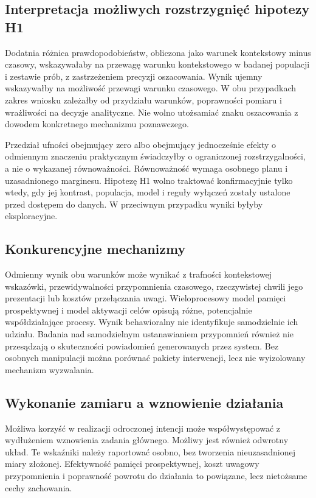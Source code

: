 \documentclass[11pt,a4paper]{article}
\begin{document}
\subsection{Interpretacja możliwych rozstrzygnięć hipotezy H1}
Dodatnia różnica prawdopodobieństw, obliczona jako warunek kontekstowy minus czasowy, wskazywałaby na przewagę warunku kontekstowego w badanej populacji i zestawie prób, z zastrzeżeniem precyzji oszacowania. Wynik ujemny wskazywałby na możliwość przewagi warunku czasowego. W obu przypadkach zakres wniosku zależałby od przydziału warunków, poprawności pomiaru i wrażliwości na decyzje analityczne. Nie wolno utożsamiać znaku oszacowania z dowodem konkretnego mechanizmu poznawczego.

Przedział ufności obejmujący zero albo obejmujący jednocześnie efekty o odmiennym znaczeniu praktycznym świadczyłby o ograniczonej rozstrzygalności, a nie o wykazanej równoważności. Równoważność wymaga osobnego planu i uzasadnionego marginesu. Hipotezę H1 wolno traktować konfirmacyjnie tylko wtedy, gdy jej kontrast, populacja, model i reguły wyłączeń zostały ustalone przed dostępem do danych. W przeciwnym przypadku wyniki byłyby eksploracyjne.

\subsection{Konkurencyjne mechanizmy}
Odmienny wynik obu warunków może wynikać z trafności kontekstowej wskazówki, przewidywalności przypomnienia czasowego, rzeczywistej chwili jego prezentacji lub kosztów przełączania uwagi. Wieloprocesowy model pamięci prospektywnej \cite{McDanielEinstein2000} i model aktywacji celów \cite{AltmannTrafton2002} opisują różne, potencjalnie współdziałające procesy. Wynik behawioralny nie identyfikuje samodzielnie ich udziału. Badania nad samodzielnym ustanawianiem przypomnień \cite{Gilbert2015} również nie przesądzają o skuteczności powiadomień generowanych przez system. Bez osobnych manipulacji można porównać pakiety interwencji, lecz nie wyizolowany mechanizm wyzwalania.

\subsection{Wykonanie zamiaru a wznowienie działania}
Możliwa korzyść w realizacji odroczonej intencji może współwystępować z wydłużeniem wznowienia zadania głównego. Możliwy jest również odwrotny układ. Te wskaźniki należy raportować osobno, bez tworzenia nieuzasadnionej miary złożonej. Efektywność pamięci prospektywnej, koszt uwagowy przypomnienia i poprawność powrotu do działania to powiązane, lecz nietożsame cechy zachowania.
\end{document}
